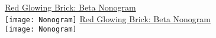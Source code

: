 \documentclass[white]{GL2020}
\begin{document}
\name{\wNonogramBeta{}}

\vspace*{0.5cm}
\begin{center}
{\LARGE \underline{Red Glowing Brick: Beta Nonogram}}\\
\vspace{0.5cm}
\texttt{[image: Nonogram]}
\vfill
{\LARGE \underline{Red Glowing Brick: Beta Nonogram}}\\
\vspace{0.5cm}
\texttt{[image: Nonogram]}
\end{center}
\end{document}
